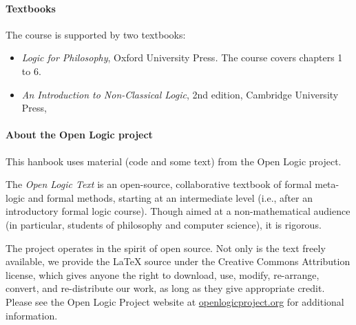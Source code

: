 \paragraph{Textbooks}

The course is supported by two textbooks:
\begin{itemize}
\item \citet{Sider2010-SIDLFP} \emph{Logic for Philosophy}, Oxford University
Press\emph{. }The course covers chapters 1 to 6.
\item \citet{PriestINCL} \emph{An Introduction to Non-Classical Logic}, 2nd 
edition, Cambridge University Press, 
\end{itemize}

\paragraph{About the Open Logic project}

This hanbook uses material (code and some text) from the Open Logic project. 

The \textit{Open Logic Text} is an open-source, collaborative textbook
of formal meta-logic and formal methods, starting at an intermediate level
(i.e., after an introductory formal logic course). Though aimed at a
non-mathematical audience (in particular, students of philosophy and
computer science), it is rigorous.

The project operates in the spirit of open source. Not only is the
text freely available, we provide the LaTeX source under the
Creative Commons Attribution license, which gives anyone the right to
download, use, modify, re-arrange, convert, and re-distribute our
work, as long as they give appropriate credit.
Please see the Open Logic Project website at
\href{http://openlogicproject.org/}{openlogicproject.org} for
additional information.

